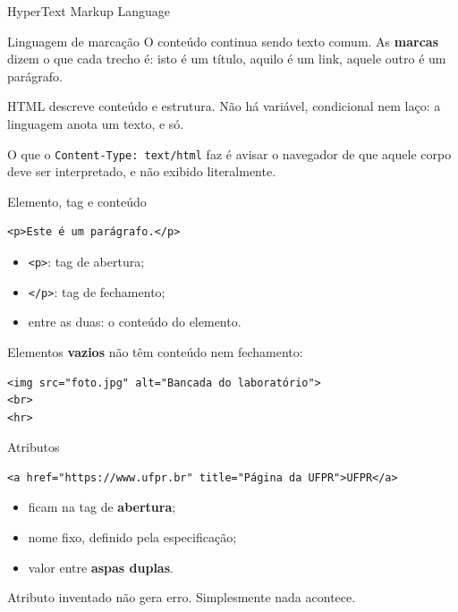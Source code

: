 \documentclass{beamer}
\begin{document}
\begin{frame}{HyperText Markup Language}
  \begin{block}{Linguagem de marcação}
    O conteúdo continua sendo texto comum. As \textbf{marcas} dizem o que cada
    trecho é: isto é um título, aquilo é um link, aquele outro é um parágrafo.
  \end{block}

  \vspace{0.5cm}
  HTML descreve conteúdo e estrutura. Não há variável, condicional nem laço:
  a linguagem anota um texto, e só.

  \vspace{0.3cm}
  O que o \texttt{Content-Type: text/html} faz é avisar o navegador de que aquele
  corpo deve ser interpretado, e não exibido literalmente.
\end{frame}

\begin{frame}[fragile]{Elemento, tag e conteúdo}
  \begin{verbatim}
<p>Este é um parágrafo.</p>
  \end{verbatim}

  \begin{itemize}
    \item \texttt{<p>}: tag de abertura;
    \item \texttt{</p>}: tag de fechamento;
    \item entre as duas: o conteúdo do elemento.
  \end{itemize}

  \vspace{0.3cm}
  Elementos \textbf{vazios} não têm conteúdo nem fechamento:

  \begin{verbatim}
<img src="foto.jpg" alt="Bancada do laboratório">
<br>
<hr>
  \end{verbatim}
\end{frame}

\begin{frame}[fragile]{Atributos}
  \begin{verbatim}
<a href="https://www.ufpr.br" title="Página da UFPR">UFPR</a>
  \end{verbatim}

  \vspace{0.3cm}
  \begin{itemize}
    \item ficam na tag de \textbf{abertura};
    \item nome fixo, definido pela especificação;
    \item valor entre \textbf{aspas duplas}.
  \end{itemize}

  \vspace{0.3cm}
  Atributo inventado não gera erro. Simplesmente nada acontece.
\end{frame}
\end{document}
